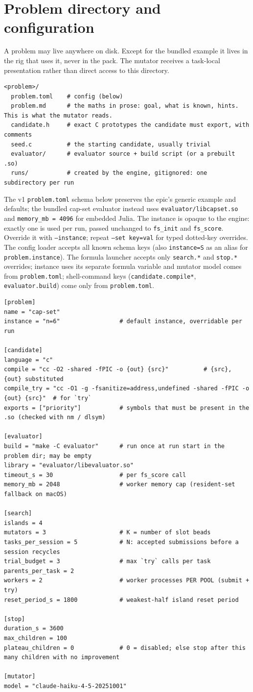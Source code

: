 \documentclass[11pt]{article}
\newcommand{\code}[1]{\texttt{#1}}
\begin{document}
\section{Problem directory and configuration}
A problem may live anywhere on disk. Except for the bundled example it lives in
the rig that uses it, never in the pack. The mutator receives a task-local
presentation rather than direct access to this directory.
\begin{lstlisting}
<problem>/
  problem.toml    # config (below)
  problem.md      # the maths in prose: goal, what is known, hints. This is what the mutator reads.
  candidate.h     # exact C prototypes the candidate must export, with comments
  seed.c          # the starting candidate, usually trivial
  evaluator/      # evaluator source + build script (or a prebuilt .so)
  runs/           # created by the engine, gitignored: one subdirectory per run
\end{lstlisting}
The v1 \code{problem.toml} schema below preserves the epic's generic example
and defaults; the bundled cap-set evaluator instead uses
\code{evaluator/libcapset.so} and \code{memory\_mb = 4096} for embedded Julia.
The instance is opaque to the engine: exactly one is used per run, passed
unchanged to \code{fs\_init} and \code{fs\_score}. Override it with
\code{--instance}; repeat \code{--set key=val} for typed dotted-key overrides.
The config loader accepts all known schema keys (also \code{instance=S} as an
alias for \code{problem.instance}). The formula launcher accepts only
\code{search.*} and \code{stop.*} overrides; instance uses its separate
formula variable and mutator model comes from \code{problem.toml};
shell-command keys (\code{candidate.compile*}, \code{evaluator.build})
come only from \code{problem.toml}.
\begin{lstlisting}
[problem]
name = "cap-set"
instance = "n=6"                 # default instance, overridable per run

[candidate]
language = "c"
compile = "cc -O2 -shared -fPIC -o {out} {src}"          # {src}, {out} substituted
compile_try = "cc -O1 -g -fsanitize=address,undefined -shared -fPIC -o {out} {src}"  # for `try`
exports = ["priority"]           # symbols that must be present in the .so (checked with nm / dlsym)

[evaluator]
build = "make -C evaluator"      # run once at run start in the problem dir; may be empty
library = "evaluator/libevaluator.so"
timeout_s = 30                   # per fs_score call
memory_mb = 2048                 # worker memory cap (resident-set fallback on macOS)

[search]
islands = 4
mutators = 3                     # K = number of slot beads
tasks_per_session = 5            # N: accepted submissions before a session recycles
trial_budget = 3                 # max `try` calls per task
parents_per_task = 2
workers = 2                      # worker processes PER POOL (submit + try)
reset_period_s = 1800            # weakest-half island reset period

[stop]
duration_s = 3600
max_children = 100
plateau_children = 0             # 0 = disabled; else stop after this many children with no improvement

[mutator]
model = "claude-haiku-4-5-20251001"
\end{lstlisting}
\end{document}
